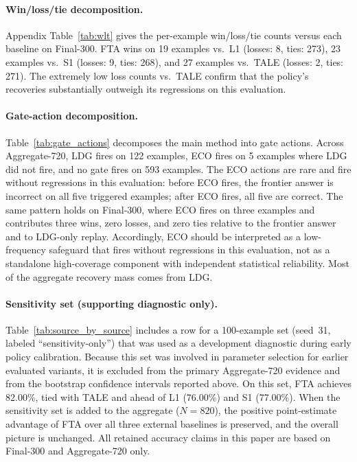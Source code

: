 \documentclass[smallcondensed]{svjour3}
\begin{document}
\paragraph{Win/loss/tie decomposition.}
Appendix Table~\ref{tab:wlt} gives the per-example win/loss/tie counts
versus each baseline on Final-300.
FTA wins on 19 examples vs.\ L1 (losses: 8, ties: 273),
23 examples vs.\ S1 (losses: 9, ties: 268), and 27 examples vs.\ TALE
(losses: 2, ties: 271).
The extremely low loss counts vs.\ TALE confirm that the policy's recoveries
substantially outweigh its regressions on this evaluation.

\paragraph{Gate-action decomposition.}
Table~\ref{tab:gate_actions} decomposes the main method into gate actions.
Across Aggregate-720, LDG fires on 122 examples, ECO fires on 5 examples
where LDG did not fire, and no gate fires on 593 examples.
The ECO actions are rare and fire without regressions in this evaluation: before ECO fires, the frontier
answer is incorrect on all five triggered examples; after ECO fires, all
five are correct.
The same pattern holds on Final-300, where ECO fires on three examples and
contributes three wins, zero losses, and zero ties relative to the frontier
answer and to LDG-only replay.
Accordingly, ECO should be interpreted as a low-frequency safeguard that
fires without regressions in this evaluation, not as a standalone high-coverage component
with independent statistical reliability.
Most of the aggregate recovery mass comes from LDG.

\paragraph{Sensitivity set (supporting diagnostic only).}
Table~\ref{tab:source_by_source} includes a row for a 100-example set
(seed~31, labeled ``sensitivity-only'') that was used as a development
diagnostic during early policy calibration.
Because this set was involved in parameter selection for earlier evaluated
variants, it is excluded from the primary Aggregate-720 evidence and from the
bootstrap confidence intervals reported above.
On this set, FTA achieves 82.00\%, tied with TALE and ahead of L1 (76.00\%)
and S1 (77.00\%).
When the sensitivity set is added to the aggregate ($N = 820$), the positive
point-estimate advantage of FTA over all three external baselines is preserved,
and the overall picture is unchanged.
All retained accuracy claims in this paper are based on Final-300 and
Aggregate-720 only.
\end{document}
